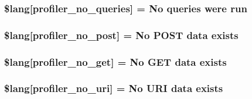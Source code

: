 \subsubsection[{\$lang}]{\setlength{\rightskip}{0pt plus 5cm}\$lang\mbox{[}\textquotesingle{}profiler\+\_\+no\+\_\+queries\textquotesingle{}\mbox{]} = \textquotesingle{}No queries were run\textquotesingle{}}\label{profiler__lang_8php_a783abf2a3410bbc9c32e4b7bb774724b}
\hypertarget{profiler__lang_8php_a06e8171d08be812398060c126233a237}{}
\subsubsection[{\$lang}]{\setlength{\rightskip}{0pt plus 5cm}\$lang\mbox{[}\textquotesingle{}profiler\+\_\+no\+\_\+post\textquotesingle{}\mbox{]} = \textquotesingle{}No P\+O\+S\+T data exists\textquotesingle{}}\label{profiler__lang_8php_a06e8171d08be812398060c126233a237}
\hypertarget{profiler__lang_8php_a8ecf037acbeb4a7b202b8238c8d1a328}{}
\subsubsection[{\$lang}]{\setlength{\rightskip}{0pt plus 5cm}\$lang\mbox{[}\textquotesingle{}profiler\+\_\+no\+\_\+get\textquotesingle{}\mbox{]} = \textquotesingle{}No G\+E\+T data exists\textquotesingle{}}\label{profiler__lang_8php_a8ecf037acbeb4a7b202b8238c8d1a328}
\hypertarget{profiler__lang_8php_ac7d16f2f99b12aeaa609be6bcb89759e}{}
\subsubsection[{\$lang}]{\setlength{\rightskip}{0pt plus 5cm}\$lang\mbox{[}\textquotesingle{}profiler\+\_\+no\+\_\+uri\textquotesingle{}\mbox{]} = \textquotesingle{}No U\+R\+I data exists\textquotesingle{}}\label{profiler__lang_8php_ac7d16f2f99b12aeaa609be6bcb89759e}
\hypertarget{profiler__lang_8php_a32345afdaa3f160ba1d21d03223313ad}{}
